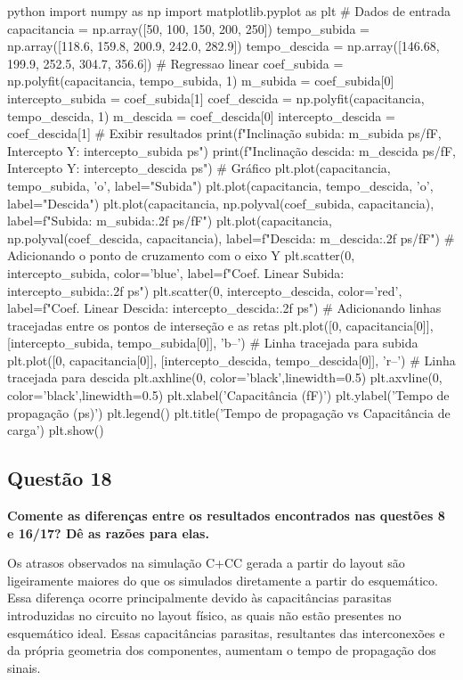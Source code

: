 ﻿\documentclass[12pt,a4paper]{article}
\begin{document}
\begin{codeblockm}{python}
import numpy as np
import matplotlib.pyplot as plt
# Dados de entrada
capacitancia = np.array([50, 100, 150, 200, 250])
tempo_subida = np.array([118.6, 159.8, 200.9, 242.0, 282.9])
tempo_descida = np.array([146.68, 199.9, 252.5, 304.7, 356.6])
# Regressao linear
coef_subida = np.polyfit(capacitancia, tempo_subida, 1)
m_subida = coef_subida[0]
intercepto_subida = coef_subida[1]
coef_descida = np.polyfit(capacitancia, tempo_descida, 1)
m_descida = coef_descida[0]
intercepto_descida = coef_descida[1]
# Exibir resultados
print(f"Inclinação subida: {m_subida} ps/fF, Intercepto Y: {intercepto_subida} ps")
print(f"Inclinação descida: {m_descida} ps/fF, Intercepto Y: {intercepto_descida} ps")
# Gráfico
plt.plot(capacitancia, tempo_subida, 'o', label="Subida")
plt.plot(capacitancia, tempo_descida, 'o', label="Descida")
plt.plot(capacitancia, np.polyval(coef_subida, capacitancia),
label=f"Subida: {m_subida:.2f} ps/fF")
plt.plot(capacitancia, np.polyval(coef_descida, capacitancia),
label=f"Descida: {m_descida:.2f} ps/fF")
# Adicionando o ponto de cruzamento com o eixo Y
plt.scatter(0, intercepto_subida, color='blue', label=f"Coef. Linear Subida: {intercepto_subida:.2f} ps")
plt.scatter(0, intercepto_descida, color='red', label=f"Coef. Linear Descida: {intercepto_descida:.2f} ps")
# Adicionando linhas tracejadas entre os pontos de interseção e as retas
plt.plot([0, capacitancia[0]], [intercepto_subida, tempo_subida[0]], 'b--')
# Linha tracejada para subida
plt.plot([0, capacitancia[0]], [intercepto_descida, tempo_descida[0]],
'r--') # Linha tracejada para descida
plt.axhline(0, color='black',linewidth=0.5)
plt.axvline(0, color='black',linewidth=0.5)
plt.xlabel('Capacitância (fF)')
plt.ylabel('Tempo de propagação (ps)')
plt.legend()
plt.title('Tempo de propagação vs Capacitância de carga')
plt.show()
\end{codeblockm}

\subsection*{Questão 18}

	\textbf{Comente as diferenças entre os resultados encontrados nas questões 8 e 16/17? Dê as razões para elas.}

Os atrasos observados na simulação C+CC gerada a partir do layout são ligeiramente maiores do que os simulados diretamente a partir do esquemático. Essa diferença ocorre principalmente devido às capacitâncias parasitas introduzidas no circuito no layout físico, as quais não estão presentes no esquemático ideal. Essas capacitâncias parasitas, resultantes das interconexões e da própria geometria dos componentes, aumentam o tempo de propagação dos sinais.
\end{document}
